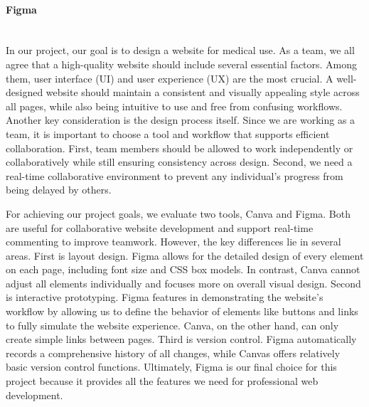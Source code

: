 %
%

\paragraph{Figma}\mbox{}\\
In our project, our goal is to design a website for medical use. As a team, we all agree that a high-quality website should include several essential factors. Among them, user interface (UI) and user experience (UX) are the most crucial. A well-designed website should maintain a consistent and visually appealing style across all pages, while also being intuitive to use and free from confusing workflows. Another key consideration is the design process itself. Since we are working as a team, it is important to choose a tool and workflow that supports efficient collaboration. First, team members should be allowed to work independently or collaboratively while still ensuring consistency across design. Second, we need a real-time collaborative environment to prevent any individual’s progress from being delayed by others. 

For achieving our project goals, we evaluate two tools, Canva and Figma. Both are useful for collaborative website development and support real-time commenting to improve teamwork. However, the key differences lie in several areas. First is layout design. Figma allows for the detailed design of every element on each page, including font size and CSS box models. In contrast, Canva cannot adjust all elements individually and focuses more on overall visual design. Second is interactive prototyping. Figma features in demonstrating the website’s workflow by allowing us to define the behavior of elements like buttons and links to fully simulate the website experience. Canva, on the other hand, can only create simple links between pages. Third is version control. Figma automatically records a comprehensive history of all changes, while Canvas offers relatively basic version control functions. Ultimately, Figma is our final choice for this project because it provides all the features we need for professional web development.


